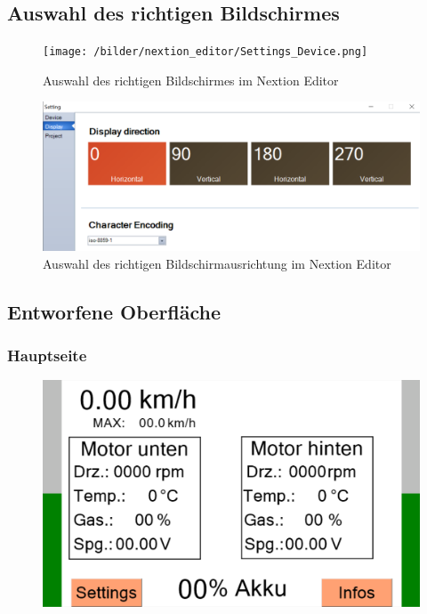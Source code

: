 \newpage
\subsection{Auswahl des richtigen Bildschirmes}
\begin{figure}[h]
    \centering
    \texttt{[image: /bilder/nextion\_editor/Settings\_Device.png]}
    \caption{Auswahl des richtigen Bildschirmes im Nextion Editor}
\end{figure}

\begin{figure}[h]
    \centering
    \includegraphics[width=\textwidth]{bilder/nextion_editor/Settings_Display.png}
    \caption{Auswahl des richtigen Bildschirmausrichtung im Nextion Editor}
\end{figure}

\newpage
\subsection{Entworfene Oberfläche}
\subsubsection{Hauptseite}
\begin{figure}[h]
    \includegraphics[width=\textwidth]{bilder/nextion_editor/main_screen.png}
\end{figure}